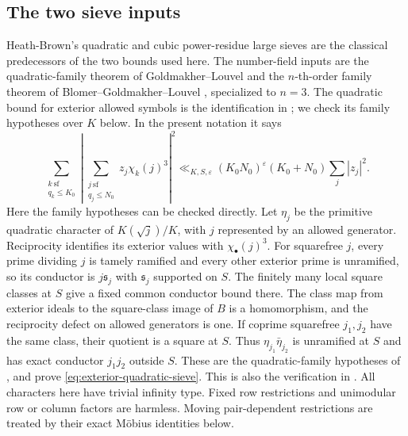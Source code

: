 \documentclass[11pt,a4paper]{article}
\numberwithin{equation}{section}
\theoremstyle{definition}
\theoremstyle{remark}
\newcommand{\eps}{\varepsilon}
\begin{document}
\subsection{The two sieve inputs}\label{sec:sieve-identification}

Heath-Brown's quadratic and cubic power-residue large sieves
\cite{HBQ,HBC} are the classical predecessors of the two bounds used
here.  The number-field inputs are the quadratic-family theorem of
Goldmakher--Louvel \cite[Theorem~1.1]{GL} and the $n$-th-order family
theorem of Blomer--Goldmakher--Louvel \cite[Theorem~1.3]{BGL}, specialized
to $n=3$.  
The quadratic bound for exterior allowed symbols is the identification
in \cite[Lemma~6.4]{P}; we check its family hypotheses over $K$ below.
In the present notation it says
\begin{equation}\label{eq:exterior-quadratic-sieve}
 \sum_{\substack{k\ \mathrm{sf}\\q_k\le K_0}}
       \left|\sum_{\substack{j\ \mathrm{sf}\\q_j\le N_0}}
                         z_j\chi_k(j)^3\right|^2
 \ll_{K,S,\eps}(K_0N_0)^\eps(K_0+N_0)\sum_j|z_j|^2.
\end{equation}
Here the family hypotheses can be checked directly.  Let $\eta_j$
be the primitive quadratic character of $K(\sqrt j)/K$, with $j$
represented by an allowed generator.  Reciprocity identifies its
exterior values with $\chi_{\bullet}(j)^3$.  For squarefree $j$,
every prime dividing $j$ is tamely ramified and every other exterior
prime is unramified, so its conductor is $j\mathfrak s_j$ with
$\mathfrak s_j$ supported on $S$.  The finitely many local square
classes at $S$ give a fixed common conductor bound there.
The class map from exterior ideals to the square-class image of
$B$ is a homomorphism, and the reciprocity defect on allowed
generators is one.  If coprime squarefree $j_1,j_2$ have the same
class, their quotient is a square at $S$.  Thus
$\eta_{j_1}\bar\eta_{j_2}$ is unramified at $S$ and has exact
conductor $j_1j_2$ outside $S$.  These are the quadratic-family
hypotheses of \cite[Definition 1 and Theorem 1.1]{GL}, and prove
\eqref{eq:exterior-quadratic-sieve}.  This is also the verification in \cite[Lemma 6.4]{P}.
All characters here have trivial infinity type.  Fixed row
restrictions and unimodular row or column factors are harmless.
Moving pair-dependent restrictions are treated by their exact
M\"obius identities below.
\end{document}

